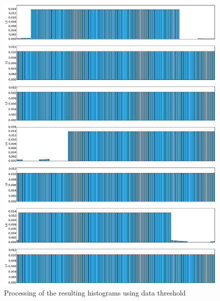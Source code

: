 \begin{figure}
\centering
\includegraphics[width=\textwidth]{./images/hist_coll2}
\caption[Processing of the resulting histograms using data threshold]{Processing of the resulting histograms using data threshold}
\label{hist_coll2}
\end{figure}

